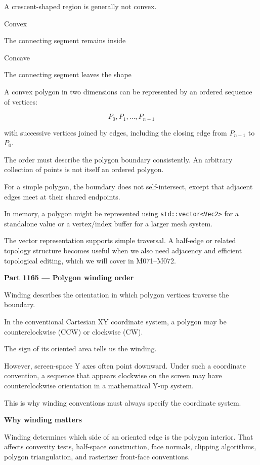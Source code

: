 A crescent-shaped region is generally not convex.

Convex

The connecting segment remains inside

Concave

The connecting segment leaves the shape

A convex polygon in two dimensions can be represented by an ordered sequence of vertices:

\[
P_0,P_1,\ldots,P_{n-1}
\]

with successive vertices joined by edges, including the closing edge from \(P_{n-1}\) to \(P_0\).

The order must describe the polygon boundary consistently. An arbitrary collection of points is not itself an ordered polygon.

For a simple polygon, the boundary does not self-intersect, except that adjacent edges meet at their shared endpoints.

In memory, a polygon might be represented using \texttt{std::vector\textless{}Vec2\textgreater{}} for a standalone value or a vertex/index buffer for a larger mesh system.

The vector representation supports simple traversal. A half-edge or related topology structure becomes useful when we also need adjacency and efficient topological editing, which we will cover in M071--M072.

\textbf{Part 1165 --- Polygon winding order}

Winding describes the orientation in which polygon vertices traverse the boundary.

In the conventional Cartesian XY coordinate system, a polygon may be counterclockwise (CCW) or clockwise (CW).

The sign of its oriented area tells us the winding.

However, screen-space Y axes often point downward. Under such a coordinate convention, a sequence that appears clockwise on the screen may have counterclockwise orientation in a mathematical Y-up system.

This is why winding conventions must always specify the coordinate system.

\textbf{Why winding matters}

Winding determines which side of an oriented edge is the polygon interior. That affects convexity tests, half-space construction, face normals, clipping algorithms, polygon triangulation, and rasterizer front-face conventions.

